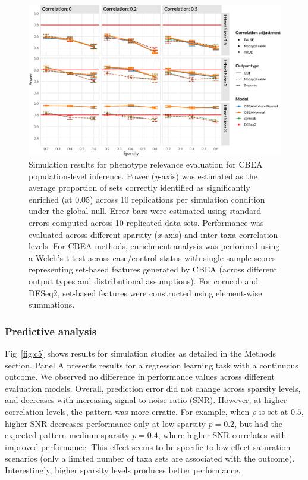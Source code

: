\begin{figure}[!h]
    \centering
    \includegraphics[width=\linewidth]{figures/appC_fs4.eps}
    \caption[Simulation results for phenotype relevance evaluation for CBEA population-level inference]{Simulation results for phenotype relevance evaluation for CBEA population-level inference. Power (\emph{y}-axis) was estimated as the average proportion of sets correctly identified as significantly enriched (at 0.05) across 10 replications per simulation condition under the global null. Error bars were estimated using standard errors computed across 10 replicated data sets. Performance was evaluated across different sparsity (\emph{x}-axis) and inter-taxa correlation levels. For CBEA methods, enrichment analysis was performed using a Welch's t-test across case/control status with single sample scores representing set-based features generated by CBEA (across different output types and distributional assumptions). For corncob and DESeq2, set-based features were constructed using element-wise summations.}
    \label{fig:c4}
\end{figure}

\subsubsection{Predictive analysis} 

Fig~\ref{fig:c5} shows results for simulation studies as detailed in the Methods section. Panel A presents results for a regression learning task with a continuous outcome. We observed no difference in performance values across different evaluation models. Overall, prediction error did not change across sparsity levels, and decreases with increasing signal-to-noise ratio (SNR). However, at higher correlation levels, the pattern was more erratic. For example, when $\rho$ is set at $0.5$, higher SNR decreases performance only at low sparsity $p = 0.2$, but had the expected pattern medium sparsity $p = 0.4$, where higher SNR correlates with improved performance. This effect seems to be specific to low effect saturation scenarios (only a limited number of taxa sets are associated with the outcome). Interestingly, higher sparsity levels produces better performance.

